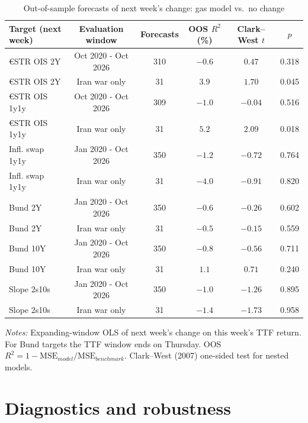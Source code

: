 \documentclass[11pt,a4paper]{article}
\begin{document}
\begin{table}[htbp]\centering\footnotesize
\caption{Out-of-sample forecasts of next week's change: gas model vs.\ no change}\label{tab:oos}
\setlength{\tabcolsep}{5pt}
\begin{tabular}{@{}lccccc@{}}
\toprule
Target (next week) & Evaluation window & Forecasts & OOS $R^2$ (\%) & Clark--West $t$ & $p$\\\midrule
\euro{}STR OIS 2Y & Oct 2020 - Oct 2026 & 310 & $-0.6$ & $0.47$ & 0.318\\
\euro{}STR OIS 2Y & Iran war only & 31 & $3.9$ & $1.70$ & 0.045\\
\euro{}STR OIS 1y1y & Oct 2020 - Oct 2026 & 309 & $-1.0$ & $-0.04$ & 0.516\\
\euro{}STR OIS 1y1y & Iran war only & 31 & $5.2$ & $2.09$ & 0.018\\
Infl. swap 1y1y & Jan 2020 - Oct 2026 & 350 & $-1.2$ & $-0.72$ & 0.764\\
Infl. swap 1y1y & Iran war only & 31 & $-4.0$ & $-0.91$ & 0.820\\
Bund 2Y & Jan 2020 - Oct 2026 & 350 & $-0.6$ & $-0.26$ & 0.602\\
Bund 2Y & Iran war only & 31 & $-0.5$ & $-0.15$ & 0.559\\
Bund 10Y & Jan 2020 - Oct 2026 & 350 & $-0.8$ & $-0.56$ & 0.711\\
Bund 10Y & Iran war only & 31 & $1.1$ & $0.71$ & 0.240\\
Slope 2s10s & Jan 2020 - Oct 2026 & 350 & $-1.0$ & $-1.26$ & 0.895\\
Slope 2s10s & Iran war only & 31 & $-1.4$ & $-1.73$ & 0.958\\
\bottomrule
\end{tabular}
\par\vspace{4pt}\begin{minipage}{0.92\textwidth}\scriptsize\textit{Notes:} Expanding-window OLS of next week's change on this week's TTF return. For Bund targets the TTF window ends on Thursday. OOS $R^2 = 1-\mathrm{MSE}_{model}/\mathrm{MSE}_{benchmark}$. Clark--West (2007) one-sided test for nested models.\end{minipage}
\end{table}

\section{Diagnostics and robustness}\label{sec:robust}
\end{document}
